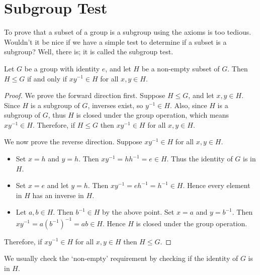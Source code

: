 \section{Subgroup Test}
To prove that a subset of a group is a subgroup using the axioms is too tedious. Wouldn't it be nice if we have a simple test to determine if a subset is a subgroup? Well, there is; it is called the subgroup test.
\begin{theorem}\label{thrm-subgroup-test}
    Let $G$ be a group with identity $e$, and let $H$ be a non-empty subset of $G$. Then $H \leq G$ if and only if $xy^{-1} \in H$ for all $x, y \in H$.
\end{theorem}
\begin{proof}
    We prove the forward direction first. Suppose $H \leq G$, and let $x, y \in H$. Since $H$ is a subgroup of $G$, inverses exist, so $y^{-1} \in H$. Also, since $H$ is a subgroup of $G$, thus $H$ is closed under the group operation, which means $xy^{-1} \in H$. Therefore, if $H \leq G$ then $xy^{-1} \in H$ for all $x, y \in H$.

    We now prove the reverse direction. Suppose $xy^{-1} \in H$ for all $x, y \in H$.
    \begin{itemize}
        \item Set $x = h$ and $y = h$. Then $xy^{-1} = hh^{-1} = e \in H$. Thus the identity of $G$ is in $H$.
        \item Set $x = e$ and let $y = h$. Then $xy^{-1} = eh^{-1} = h^{-1} \in H$. Hence every element in $H$ has an inverse in $H$.
        \item Let $a, b \in H$. Then $b^{-1} \in H$ by the above point. Set $x = a$ and $y = b^{-1}$. Then $xy^{-1} = a\left(b^{-1}\right)^{-1} = ab \in H$. Hence $H$ is closed under the group operation.
    \end{itemize}
    Therefore, if $xy^{-1} \in H$ for all $x, y \in H$ then $H \leq G$.
\end{proof}
\begin{remark}
    We usually check the `non-empty' requirement by checking if the identity of $G$ is in $H$.
\end{remark}


